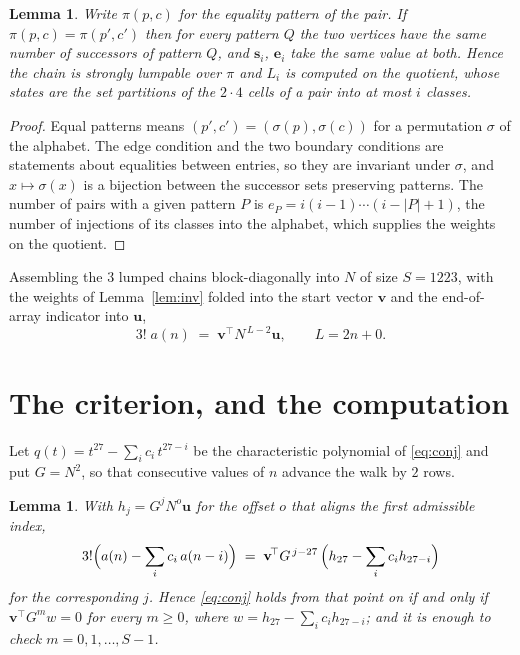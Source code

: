 \documentclass[11pt,a4paper]{article}
\theoremstyle{plain}
\newtheorem{lemma}[theorem]{Lemma}
\theoremstyle{definition}
\begin{document}
\begin{lemma}\label{lem:lump}
Write $\pi(p,c)$ for the equality pattern of the pair. If $\pi(p,c)=\pi(p',c')$ then for
every pattern $Q$ the two vertices have the same number of successors of pattern $Q$, and
$\mathbf{s}_i$, $\mathbf{e}_i$ take the same value at both. Hence the chain is strongly
lumpable over $\pi$ and $L_i$ is computed on the quotient, whose states are the set
partitions of the $2\cdot4$ cells of a pair into at most $i$ classes.
\end{lemma}

\begin{proof}
Equal patterns means $(p',c')=(\sigma(p),\sigma(c))$ for a permutation $\sigma$ of the
alphabet. The edge condition and the two boundary conditions are statements about equalities
between entries, so they are invariant under $\sigma$, and $x\mapsto\sigma(x)$ is a bijection
between the successor sets preserving patterns. The number of pairs with a given pattern $P$
is $e_P=i(i-1)\cdots(i-|P|+1)$, the number of injections of its classes into the alphabet,
which supplies the weights on the quotient.
\end{proof}

Assembling the $3$ lumped chains block-diagonally into $N$ of size $S=1223$, with the
weights of Lemma~\ref{lem:inv} folded into the start vector $\mathbf{v}$ and the
end-of-array indicator into $\mathbf{u}$,
\begin{equation}\label{eq:walk2}
3!\;a(n)\;=\;\mathbf{v}^{\!\top}N^{\,L-2}\mathbf{u},\qquad L=2n+0 .
\end{equation}

\section{The criterion, and the computation}

Let $q(t)=t^{27}-\sum_i c_i\,t^{27-i}$ be the characteristic polynomial of
\eqref{eq:conj} and put $G=N^{2}$, so that consecutive values of $n$ advance the
walk by $2$ rows.

\begin{lemma}\label{lem:crit}
With $h_j=G^{j}N^{o}\mathbf{u}$ for the offset $o$ that aligns the first admissible
index,
\[
3!\Bigl(a(n)-\sum_i c_i\,a(n-i)\Bigr)\;=\;\mathbf{v}^{\!\top}G^{\,j-27}\,
\Bigl(h_{27}-\sum_i c_i h_{27-i}\Bigr)
\]
for the corresponding $j$. Hence \eqref{eq:conj} holds from that point on if and only if
$\mathbf{v}^{\!\top}G^{m}w=0$ for every $m\ge0$, where
$w=h_{27}-\sum_i c_ih_{27-i}$; and it is enough to check $m=0,1,\dots,S-1$.
\end{lemma}
\end{document}
